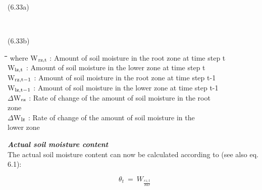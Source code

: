 \documentclass[11pt]{article}
\begin{document}
 \bigskip
\strut\hfill (6.33a)\\
\strut\hfill \\
\strut\hfill (6.33b)
\nwln
\begin{tabbing}
\hspace{1.27cm}\=\hspace{1.27cm}\=\hspace{1.27cm}\=\hspace{1.27cm}\=%
\hspace{1.27cm}\=\hspace{1.27cm}\=\hspace{1.27cm}\=\hspace{1.27cm}\=%
\hspace{1.27cm}\=\hspace{1.27cm}\=\kill
where\> W$_{{\rm rz,t}}$\> : Amount of soil moisture in the root zone at time step t\> \> \> \> \> \> \> \> [cm]\\
\>W$_{{\rm lz,t}}$\> : Amount of soil moisture in the lower zone at time step t\> \> \> \> \> \> \> \> [cm]\\
\>W$_{{\rm rz,t-1}}$\> : Amount of soil moisture in the root zone at time step t-1\> \> \> \> \> \> \> \> [cm]\\
\>W$_{{\rm lz,t-1}}$\> : Amount of soil moisture in the lower zone at time step t-1\> \> \> \> \> \> \> \> [cm]\\
\>$\Delta$W$_{{\rm rz}}$\> : Rate of change of the amount of soil moisture in the root \\
\>\>   zone\> \> \> \> \> \> \> \> [cm]\\
\>$\Delta$W$_{{\rm lz}}$\> : Rate of change of the amount of soil moisture in the \\
\>\>   lower zone\> \> \> \> \> \> \> \> [cm]
\end{tabbing}

\bigskip
{\it {\bf Actual soil moisture content}\/}\\
The actual soil moisture content can now be calculated according to (see also eq. 6.1):

\begin{displaymath}
\theta _{t} ~=~ W _{\frac{rz, t}{RD}} 
\end{displaymath}
\end{document}
